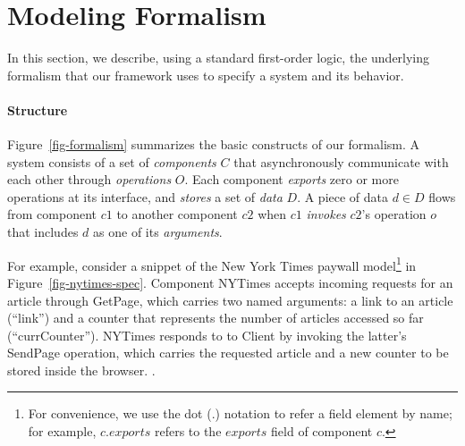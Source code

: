 
\section{Modeling Formalism}
\label{sec-formalism}

In this section, we describe, using a standard first-order logic, the
underlying formalism that our framework uses to specify a system and
its behavior. 

\paragraph{\textbf{Structure}} Figure~\ref{fig-formalism} summarizes
the basic constructs of our formalism. A system consists of a set of
\textit{components} $C$ that asynchronously communicate with each
other through \textit{operations} $O$. Each component \textit{exports} zero or
more operations at its interface, and \textit{stores} a set of
\textit{data} $D$. A piece of data $d \in D$ flows from component $c1$
to another component $c2$ when $c1$ \textit{invokes} $c2$'s operation
$o$ that includes $d$ as one of its \textit{arguments}. 

For example, consider a snippet of the New York Times paywall
model\footnote{For convenience, we use the dot (.)  notation to refer
  a field element by name; for example, $c.exports$ refers to the
  $exports$ field of component $c$.} in
Figure~\ref{fig-nytimes-spec}. Component \textsf{NYTimes} accepts
incoming requests for an article through \textsf{GetPage}, which
carries two named arguments: a link to an article (\textsf{``link''})
and a counter that represents the number of articles accessed so far
(\textsf{``currCounter''}). \textsf{NYTimes} responds to to
\textsf{Client} by invoking the latter's \textsf{SendPage} operation,
which carries the requested article and a new counter to be stored
inside the browser. .

